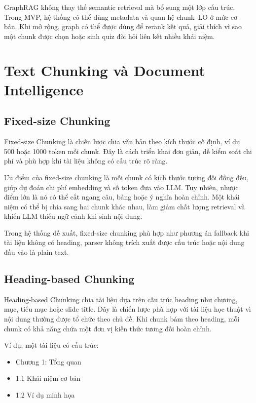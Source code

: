 GraphRAG không thay thế semantic retrieval mà bổ sung một lớp cấu trúc. Trong
MVP, hệ thống có thể dùng metadata và quan hệ chunk--LO ở mức cơ bản. Khi mở
rộng, graph có thể được dùng để rerank kết quả, giải thích vì sao một chunk
được chọn hoặc sinh quiz đòi hỏi liên kết nhiều khái niệm.

\section{Text Chunking và Document Intelligence}
\label{sec:text-chunking-document-intelligence}

\subsection{Fixed-size Chunking}
\label{subsec:fixed-size-chunking}

Fixed-size Chunking là chiến lược chia văn bản theo kích thước cố định, ví dụ
500 hoặc 1000 token mỗi chunk. Đây là cách triển khai đơn giản, dễ kiểm soát
chi phí và phù hợp khi tài liệu không có cấu trúc rõ ràng.

Ưu điểm của fixed-size chunking là mỗi chunk có kích thước tương đối đồng đều,
giúp dự đoán chi phí embedding và số token đưa vào LLM. Tuy nhiên, nhược điểm
lớn là nó có thể cắt ngang câu, bảng hoặc ý nghĩa hoàn chỉnh. Một khái niệm có
thể bị chia sang hai chunk khác nhau, làm giảm chất lượng retrieval và khiến
LLM thiếu ngữ cảnh khi sinh nội dung.

Trong hệ thống đề xuất, fixed-size chunking phù hợp như phương án fallback khi
tài liệu không có heading, parser không trích xuất được cấu trúc hoặc nội dung
đầu vào là plain text.

\subsection{Heading-based Chunking}
\label{subsec:heading-based-chunking}

Heading-based Chunking chia tài liệu dựa trên cấu trúc heading như chương,
mục, tiểu mục hoặc slide title. Đây là chiến lược phù hợp với tài liệu học
thuật vì nội dung thường được tổ chức theo chủ đề. Khi chunk bám theo heading,
mỗi chunk có khả năng chứa một đơn vị kiến thức tương đối hoàn chỉnh.

Ví dụ, một tài liệu có cấu trúc:

\begin{itemize}
    \item Chương 1: Tổng quan
    \item 1.1 Khái niệm cơ bản
    \item 1.2 Ví dụ minh họa
\end{itemize}

